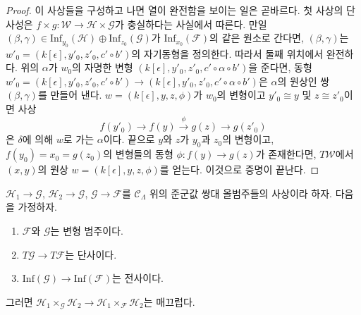 \begin{proof}
\medskip\noindent
이 사상들을 구성하고 나면 열이 완전함을 보이는 일은 곧바르다.
첫 사상의 단사성은
$f \times g : \mathcal{W} \to \mathcal{H} \times \mathcal{G}$가
충실하다는 사실에서 따른다. 만일
$(\beta, \gamma) \in
\text{Inf}_{y_0}(\mathcal{H}) \oplus \text{Inf}_{z_0}(\mathcal{G})$가
$\text{Inf}_{x_0}(\mathcal{F})$의 같은 원소로 간다면,
$(\beta, \gamma)$는
$w'_0 = (k[\epsilon], y'_0, z'_0, c' \circ b')$의 자기동형을 정의한다.
따라서 둘째 위치에서 완전하다. 위의 $\alpha$가 $w_0$의 자명한 변형
$(k[\epsilon], y'_0, z'_0, c' \circ \alpha \circ b')$을 준다면, 동형
$w'_0 = (k[\epsilon], y'_0, z'_0, c' \circ b') \to
(k[\epsilon], y'_0, z'_0, c' \circ \alpha \circ b')$은 $\alpha$의 원상인
쌍 $(\beta, \gamma)$를 만들어 낸다.
$w = (k[\epsilon], y, z, \phi)$가 $w_0$의 변형이고
$y'_0 \cong y$ 및 $z \cong z'_0$이면 사상
$$
f(y'_0) \to f(y) \xrightarrow{\phi} g(z) \to g(z'_0)
$$
은 $\delta$에 의해 $w$로 가는 $\alpha$이다.
끝으로 $y$와 $z$가 $y_0$과 $z_0$의 변형이고,
$f(y_0) = x_0 = g(z_0)$의 변형들의 동형
$\phi : f(y) \to g(z)$가 존재한다면,
$T\mathcal{W}$에서 $(x, y)$의 원상
$w = (k[\epsilon], y, z, \phi)$를 얻는다. 이것으로 증명이 끝난다.
\end{proof}

\begin{lemma}
\label{lemma-map-fibre-products-smooth}
$\mathcal{H}_1 \to \mathcal{G}$, $\mathcal{H}_2 \to \mathcal{G}$,
$\mathcal{G} \to \mathcal{F}$를 $\mathcal{C}_\Lambda$ 위의 준군값 쌍대
올범주들의 사상이라 하자. 다음을 가정하자.
\begin{enumerate}
\item $\mathcal{F}$와 $\mathcal{G}$는 변형 범주이다.
\item $T\mathcal{G} \to T\mathcal{F}$는 단사이다.
\item $\text{Inf}(\mathcal{G}) \to \text{Inf}(\mathcal{F})$는 전사이다.
\end{enumerate}
그러면
$\mathcal{H}_1 \times_\mathcal{G} \mathcal{H}_2 \to
\mathcal{H}_1 \times_\mathcal{F} \mathcal{H}_2$는 매끄럽다.
\end{lemma}

